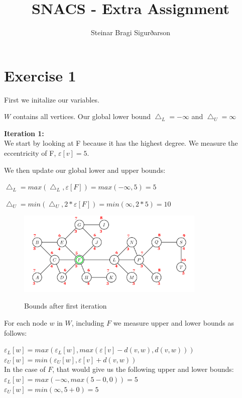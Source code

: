 \documentclass[12pt]{amsart}
\title{SNACS - Extra Assignment}
\author{Steinar Bragi Sigurðarson}
\date{}
\begin{document}
\maketitle

\section{Exercise 1}

First we initalize our variables.

$W$ contains all vertices. Our global lower bound $\bigtriangleup_L = -\infty$ and $\bigtriangleup_U = \infty$


\textbf{Iteration 1:}\\
We start by looking at F because it has the highest degree.
We measure the eccentricity of F, $\varepsilon[v] = 5$.

We then update our global lower and upper bounds:

$\bigtriangleup_L = max(\bigtriangleup_L, \varepsilon[F]) = max(-\infty, 5) = 5$

$\bigtriangleup_U = min(\bigtriangleup_U, 2* \varepsilon[F]) = min(\infty, 2*5) = 10$

\begin{figure}[h]
\caption{Bounds after first iteration}
\centering
\includegraphics[width=0.8\textwidth]{iter1.png}
\label{iter1}
\end{figure}

For each node $w$ in $W$, including $F$ we measure upper and lower bounds as follows:

$\varepsilon_L[w] = max(\varepsilon_L[w],max(\varepsilon[v] - d(v,w),d(v,w)))$\\
$\varepsilon_U[w] = min(\varepsilon_U[w],\varepsilon[v] + d(v,w))$\\

In the case of $F$, that would give us the following upper and lower bounds:\\

$\varepsilon_L[w] = max(-\infty,max(5 - 0, 0)) = 5$\\
$\varepsilon_U[w] = min(\infty,5 + 0) = 5$\\
\end{document}
